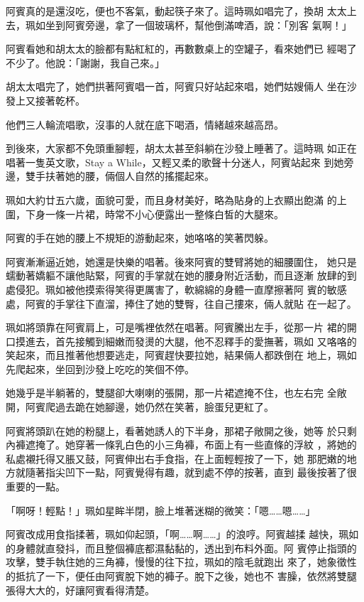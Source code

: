 阿賓真的是還沒吃，便也不客氣，動起筷子來了。這時珮如唱完了，換胡
太太上去，珮如坐到阿賓旁邊，拿了一個玻璃杯，幫他倒滿啤酒，說：「別客
氣啊！」

阿賓看她和胡太太的臉都有點紅紅的，再數數桌上的空罐子，看來她們已
經喝了不少了。他說：「謝謝，我自己來。」

胡太太唱完了，她們拱著阿賓唱一首，阿賓只好站起來唱，她們姑嫂倆人
坐在沙發上又接著乾杯。

他們三人輪流唱歌，沒事的人就在底下喝酒，情緒越來越高昂。

到後來，大家都不免頭重腳輕，胡太太甚至斜躺在沙發上睡著了。這時珮
如正在唱著一隻英文歌，Stay a While，又輕又柔的歌聲十分迷人，阿賓站起來
到她旁邊，雙手扶著她的腰，倆個人自然的搖擺起來。

珮如大約廿五六歲，面貌可愛，而且身材美好，略為貼身的上衣顯出飽滿
的上圍，下身一條一片裙，時常不小心便露出一整條白皙的大腿來。

阿賓的手在她的腰上不規矩的游動起來，她咯咯的笑著閃躲。

阿賓漸漸逼近她，她還是快樂的唱著。後來阿賓的雙臂將她的細腰圍住，
她只是蠕動著嬌軀不讓他貼緊，阿賓的手掌就在她的腰身附近活動，而且逐漸
放肆的到處侵犯。珮如被他摸索得笑得更厲害了，軟綿綿的身體一直摩擦著阿
賓的敏感處，阿賓的手掌往下直溜，捧住了她的雙臀，往自己摟來，倆人就貼
在一起了。

珮如將頭靠在阿賓肩上，可是嘴裡依然在唱著。阿賓騰出左手，從那一片
裙的開口摸進去，首先接觸到細嫩而發燙的大腿，他不忍釋手的愛撫著，珮如
又咯咯的笑起來，而且推著他想要逃走，阿賓趕快要拉她，結果倆人都跌倒在
地上，珮如先爬起來，坐回到沙發上吃吃的笑個不停。

她幾乎是半躺著的，雙腿卻大喇喇的張開，那一片裙遮掩不住，也左右完
全敞開，阿賓爬過去跪在她腳邊，她仍然在笑著，臉蛋兒更紅了。

阿賓將頭趴在她的粉腿上，看著她誘人的下半身，那裙子敞開之後，她等
於只剩內褲遮掩了。她穿著一條乳白色的小三角褲，布面上有一些直條的浮紋
，將她的私處襯托得又脹又鼓，阿賓伸出右手食指，在上面輕輕按了一下，她
那肥嫩的地方就隨著指尖凹下一點，阿賓覺得有趣，就到處不停的按著，直到
最後按著了很重要的一點。

「啊呀！輕點！」珮如星眸半閉，臉上堆著迷糊的微笑：「嗯……嗯……」

阿賓改成用食指揉著，珮如仰起頭，「啊……啊……」的浪哼。阿賓越揉
越快，珮如的身體就直發抖，而且整個褲底都濕黏黏的，透出到布料外面。阿
賓停止指頭的攻擊，雙手執住她的三角褲，慢慢的往下拉，珮如的陰毛就跑出
來了，她象徵性的抵抗了一下，便任由阿賓脫下她的褲子。脫下之後，她也不
害臊，依然將雙腿張得大大的，好讓阿賓看得清楚。

